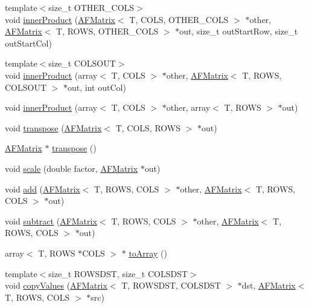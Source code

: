 \begin{DoxyCompactItemize}
\item 
{\footnotesize template$<$size\+\_\+t O\+T\+H\+E\+R\+\_\+\+C\+O\+LS$>$ }\\void \hyperlink{class_a_f_matrix_a735c5a51f49427b88555d718b9055b1b}{inner\+Product} (\hyperlink{class_a_f_matrix}{A\+F\+Matrix}$<$ T, C\+O\+LS, O\+T\+H\+E\+R\+\_\+\+C\+O\+LS $>$ $\ast$other, \hyperlink{class_a_f_matrix}{A\+F\+Matrix}$<$ T, R\+O\+WS, O\+T\+H\+E\+R\+\_\+\+C\+O\+LS $>$ $\ast$out, size\+\_\+t out\+Start\+Row, size\+\_\+t out\+Start\+Col)
\item 
{\footnotesize template$<$size\+\_\+t C\+O\+L\+S\+O\+UT$>$ }\\void \hyperlink{class_a_f_matrix_a46b0627e74a9a013b12578734d3fe8dc}{inner\+Product} (array$<$ T, C\+O\+LS $>$ $\ast$other, \hyperlink{class_a_f_matrix}{A\+F\+Matrix}$<$ T, R\+O\+WS, C\+O\+L\+S\+O\+UT $>$ $\ast$out, int out\+Col)
\item 
void \hyperlink{class_a_f_matrix_ab0d162f4bf848e2d93ed0e65ecea606b}{inner\+Product} (array$<$ T, C\+O\+LS $>$ $\ast$other, array$<$ T, R\+O\+WS $>$ $\ast$out)
\item 
void \hyperlink{class_a_f_matrix_ae087fb4a064d256eac51513863b06fa2}{transpose} (\hyperlink{class_a_f_matrix}{A\+F\+Matrix}$<$ T, C\+O\+LS, R\+O\+WS $>$ $\ast$out)
\item 
\hyperlink{class_a_f_matrix}{A\+F\+Matrix} $\ast$ \hyperlink{class_a_f_matrix_a5f20b3ee2b16cbb9b9b39215a81d3aa1}{transpose} ()
\item 
void \hyperlink{class_a_f_matrix_a905b58769fceaf03972f7ea179ea3934}{scale} (double factor, \hyperlink{class_a_f_matrix}{A\+F\+Matrix} $\ast$out)
\item 
void \hyperlink{class_a_f_matrix_ac6a47fbe48cd01f2c4859ae78f03ab32}{add} (\hyperlink{class_a_f_matrix}{A\+F\+Matrix}$<$ T, R\+O\+WS, C\+O\+LS $>$ $\ast$other, \hyperlink{class_a_f_matrix}{A\+F\+Matrix}$<$ T, R\+O\+WS, C\+O\+LS $>$ $\ast$out)
\item 
void \hyperlink{class_a_f_matrix_a85ffed84dc6b1acb24a2c73e54511dff}{subtract} (\hyperlink{class_a_f_matrix}{A\+F\+Matrix}$<$ T, R\+O\+WS, C\+O\+LS $>$ $\ast$other, \hyperlink{class_a_f_matrix}{A\+F\+Matrix}$<$ T, R\+O\+WS, C\+O\+LS $>$ $\ast$out)
\item 
array$<$ T, R\+O\+WS $\ast$C\+O\+LS $>$ $\ast$ \hyperlink{class_a_f_matrix_a7e3659073ff6da5ffd02de48156decf5}{to\+Array} ()
\item 
{\footnotesize template$<$size\+\_\+t R\+O\+W\+S\+D\+ST, size\+\_\+t C\+O\+L\+S\+D\+ST$>$ }\\void \hyperlink{class_a_f_matrix_a599d98652f79f6762b812ec0a4fd7216}{copy\+Values} (\hyperlink{class_a_f_matrix}{A\+F\+Matrix}$<$ T, R\+O\+W\+S\+D\+ST, C\+O\+L\+S\+D\+ST $>$ $\ast$dst, \hyperlink{class_a_f_matrix}{A\+F\+Matrix}$<$ T, R\+O\+WS, C\+O\+LS $>$ $\ast$src)

\end{DoxyCompactItemize}
